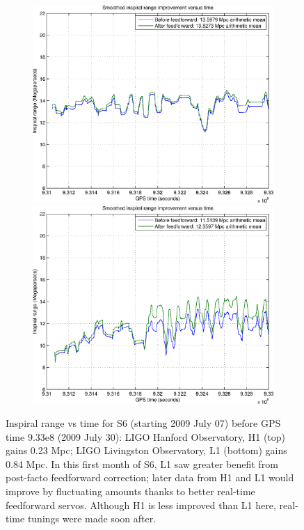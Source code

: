 \begin{figure}
\begin{center}
\includegraphics[height=75mm, width=150mm]{figure14a.eps}
\includegraphics[height=75mm, width=150mm]{figure14b.eps}
\caption{Inspiral range vs time for S6 (starting 2009 July 07) before GPS time 9.33e8 (2009 July 30):
LIGO Hanford Observatory, H1 (top) gains 0.23 Mpc; LIGO Livingston Observatory, L1 (bottom) gains 0.84 Mpc. In this first month of S6, L1 saw greater benefit from post-facto feedforward correction; later data from H1 and L1 would improve by fluctuating amounts thanks to better real-time feedforward servos. Although H1 is less improved than L1 here, real-time tunings were made soon after.}
\label{S6inspiralRange}
\end{center}
\end{figure}

